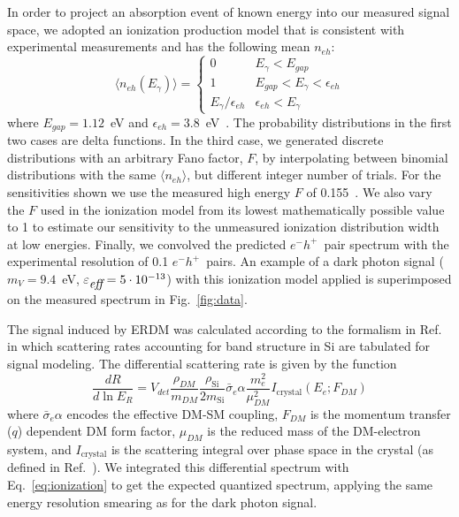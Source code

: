 \documentclass[%
reprint,
superscriptaddress,
preprintnumbers,
amsmath,amssymb,
prl,
aps,
floatfix
]{revtex4-1}
\newcommand{\eh}{$e^-h^+$}
\begin{document}
In order to project an absorption event of known energy into our measured signal space, we adopted an ionization production model that is consistent with experimental measurements \cite{Wolf_98JAP_QYieldSolarCells, Christensen_76JAP_QYield,WilkinsonF_83JAP_QYield} and has the following mean $n_{eh}$:
\begin{equation}
\langle n_{eh}(E_{\gamma}) \rangle =\begin{cases}
0 & E_{\gamma} < E_{gap}\\
1 & E_{gap} < E_{\gamma} < \epsilon_{eh} \\
E_\gamma/\epsilon_{eh} & \epsilon_{eh} < E_{\gamma}
\end{cases}\label{eq:ionization}
\end{equation}
where $E_{gap}=1.12$~eV and $\epsilon_{eh}=3.8$~eV~\cite{Vavilov}. The probability distributions in the first two cases are delta functions. In the third case, we  generated discrete distributions with an arbitrary Fano factor, $F$, by interpolating between binomial distributions with the same $\langle n_{eh} \rangle$, but different integer number of trials. For the sensitivities shown we use the measured high energy $F$ of 0.155~\cite{OWENS_02NIM_Fano}. We also vary the $F$ used in the ionization model from its lowest mathematically possible value to 1 to estimate our sensitivity to the unmeasured ionization distribution width at low energies. Finally, we convolved the predicted \eh\ pair spectrum with the experimental resolution of 0.1 \eh\ pairs. An example of a dark photon signal ($m_{V}=9.4$~eV, $\varepsilon_{\mbox{\it eff}}=5\cdot 10^{-13}$) with this ionization model applied is superimposed on the measured spectrum in Fig.~\ref{fig:data}.

The signal induced by ERDM was calculated according to the formalism in Ref.~\cite{Essig} in which scattering rates accounting for band structure in Si are tabulated for signal modeling. The differential scattering rate is given by the function
\begin{equation}
\frac{dR}{d\ln E_R}=V_{det}\frac{\rho_{DM}}{m_{DM}}\frac{\rho_{\text{Si}}}{2m_{\text{Si}}}\bar{\sigma}_e\alpha \frac{m_{e}^2}{\mu_{DM}^2} I_{\mathrm{crystal}}(E_e;F_{DM})
\end{equation}
where $\bar{\sigma}_e\alpha$ encodes the effective DM-SM coupling, $F_{DM}$ is the momentum transfer ($q$) dependent DM form factor, $\mu_{DM}$ is the reduced mass of the DM-electron system, and $I_{\mathrm{crystal}}$ is the scattering integral over phase space in the crystal (as defined in Ref.~\cite{Essig}). We integrated this differential spectrum with Eq.~\ref{eq:ionization} to get the expected quantized spectrum, applying the same energy resolution smearing as for the dark photon signal.
\end{document}
